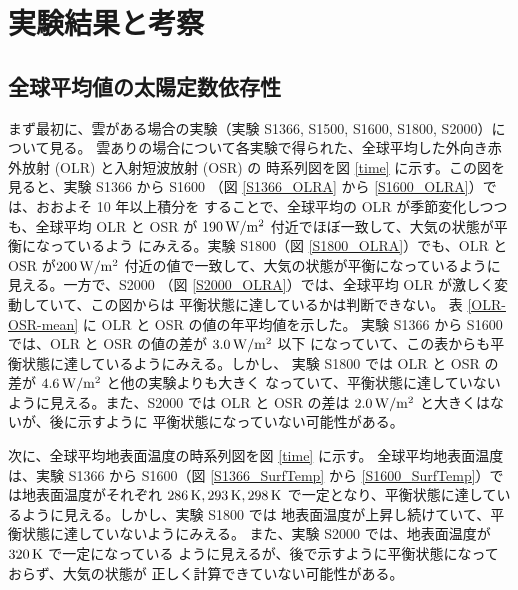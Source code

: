 \documentclass[body]{subfiles}
\begin{document}
\chapter{実験結果と考察}

\section{全球平均値の太陽定数依存性}

まず最初に、雲がある場合の実験（実験 S1366, S1500, S1600, S1800, S2000）に
ついて見る。
雲ありの場合について各実験で得られた、全球平均した外向き赤外放射 (OLR) と入射短波放射 (OSR) の
時系列図を図 \ref{time} に示す。この図を見ると、実験 S1366 から S1600
（図 \ref{S1366_OLRA} から \ref{S1600_OLRA}）では、おおよそ 10 年以上積分を
することで、全球平均の OLR が季節変化しつつも、全球平均 OLR と OSR が
\(190\hmu{W/m^2}\) 付近でほぼ一致して、大気の状態が平衡になっているよう
にみえる。実験 S1800（図 \ref{S1800_OLRA}）でも、OLR と OSR が\(200\hmu{W/m^2}\)
付近の値で一致して、大気の状態が平衡になっているように見える。一方で、S2000
（図 \ref{S2000_OLRA}）では、全球平均 OLR が激しく変動していて、この図からは
平衡状態に達しているかは判断できない。
表 \ref{OLR-OSR-mean} に OLR と OSR の値の年平均値を示した。
実験 S1366 から S1600 では、OLR と OSR の値の差が \(3.0\hmu{W/m^2}\) 以下
になっていて、この表からも平衡状態に達しているようにみえる。しかし、
実験 S1800 では OLR と OSR の差が \(4.6\hmu{W/m^2}\) と他の実験よりも大きく
なっていて、平衡状態に達していないように見える。また、S2000 では OLR と
OSR の差は \(2.0\hmu{W/m^2}\) と大きくはないが、後に示すように
平衡状態になっていない可能性がある。

次に、全球平均地表面温度の時系列図を図 \ref{time} に示す。
全球平均地表面温度は、実験 S1366 から S1600（図 \ref{S1366_SurfTemp} から
\ref{S1600_SurfTemp}）では地表面温度がそれぞれ \(286\hmu{K}, 293\hmu{K}, 298\hmu{K}\)
で一定となり、平衡状態に達しているように見える。しかし、実験 S1800 では
地表面温度が上昇し続けていて、平衡状態に達していないようにみえる。
また、実験 S2000 では、地表面温度が \(320\hmu{K}\) で一定になっている
ように見えるが、後で示すように平衡状態になっておらず、大気の状態が
正しく計算できていない可能性がある。

\end{document}
